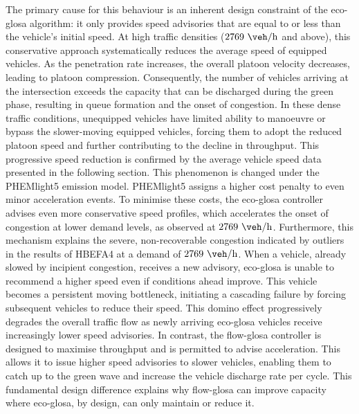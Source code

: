 The primary cause for this behaviour is an inherent design constraint of the \ac{eco-glosa} algorithm: it only provides speed advisories that are equal to or less than the vehicle's initial speed. At high traffic densities ($2769~\unit{\veh\per\hour}$ and above), this conservative approach systematically reduces the average speed of equipped vehicles. As the penetration rate increases, the overall platoon velocity decreases, leading to platoon compression. Consequently, the number of vehicles arriving at the intersection exceeds the capacity that can be discharged during the green phase, resulting in queue formation and the onset of congestion. In these dense traffic conditions, unequipped vehicles have limited ability to manoeuvre or bypass the slower-moving equipped vehicles, forcing them to adopt the reduced platoon speed and further contributing to the decline in throughput. This progressive speed reduction is confirmed by the average vehicle speed data presented in the following section.
\mynewline
This phenomenon is changed under the PHEMlight5 emission model. PHEMlight5 assigns a higher cost penalty to even minor acceleration events. To minimise these costs, the \ac{eco-glosa} controller advises even more conservative speed profiles, which accelerates the onset of congestion at lower demand levels, as observed at $2769~\unit{\veh\per\hour}$.
Furthermore, this mechanism explains the severe, non-recoverable congestion indicated by outliers in the results of HBEFA4 at a demand of $2769~\unit{\veh\per\hour}$. When a vehicle, already slowed by incipient congestion, receives a new advisory, \ac{eco-glosa} is unable to recommend a higher speed even if conditions ahead improve. This vehicle becomes a persistent moving bottleneck, initiating a cascading failure by forcing subsequent vehicles to reduce their speed. This domino effect progressively degrades the overall traffic flow as newly arriving \ac{eco-glosa} vehicles receive increasingly lower speed advisories.
\mynewline
In contrast, the \ac{flow-glosa} controller is designed to maximise throughput and is permitted to advise acceleration. This allows it to issue higher speed advisories to slower vehicles, enabling them to catch up to the green wave and increase the vehicle discharge rate per cycle. This fundamental design difference explains why \ac{flow-glosa} can improve capacity where \ac{eco-glosa}, by design, can only maintain or reduce it.

